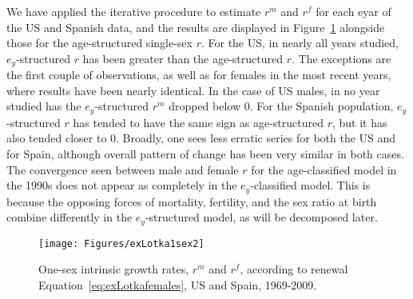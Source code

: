   \FloatBarrier
  \label{sec:trendsinrex1sex}
 We have applied the iterative procedure to estimate $r^m$ and $r^f$ for each
 eyar of the US and Spanish data, and the results are displayed in
  Figure~\ref{fig:rex1sex} alongside those for the age-structured single-sex
  $r$. For the US, in nearly all years studied, $e_y$-structured $r$ has been
  greater than the age-structured $r$. The exceptions are the first couple of
  observations, as well as for females in the most recent years, where results
  have been nearly identical. In the case of US males, in no year studied has the $e_y$-structured
  $r^m$ dropped below 0. For the Spanish population,  $e_y$-structured $r$
  has tended to have the same sign as age-structured $r$, but it has also
  tended closer to 0. Broadly, one sees less erratic series for both the US and
  for Spain, although overall pattern of change has been very similar in both
  cases. The convergence seen between male and female $r$ for the age-classified 
  model in the 1990s does not appear as completely in the $e_y$-classified
  model. This is because the opposing forces of mortality, fertility, and the sex ratio at birth 
  combine differently in the $e_y$-structured model, as will be decomposed later.

\begin{figure}[!ht]
  \centering
    \caption{One-sex intrinsic growth rates, $r^m$ and $r^f$, according to
    renewal Equation~\eqref{eq:exLotkafemales}, US and Spain, 1969-2009.}
     \texttt{[image: Figures/exLotka1sex2]}
     \label{fig:rex1sex}
\end{figure}




 \FloatBarrier
